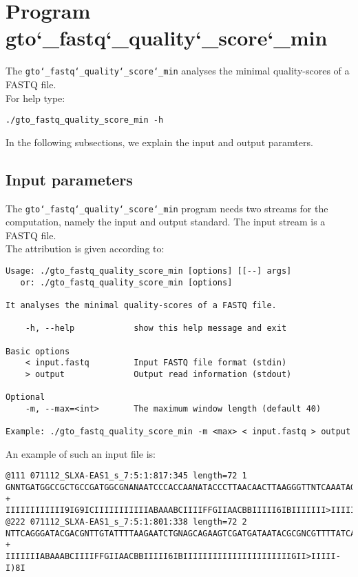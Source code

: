 \section{Program gto\char`_fastq\char`_quality\char`_score\char`_min}
The \texttt{gto\char`_fastq\char`_quality\char`_score\char`_min} analyses the minimal quality-scores of a FASTQ file.\\
For help type:
\begin{lstlisting}
./gto_fastq_quality_score_min -h
\end{lstlisting}
In the following subsections, we explain the input and output paramters.

\subsection*{Input parameters}

The \texttt{gto\char`_fastq\char`_quality\char`_score\char`_min} program needs two streams for the computation, namely the input and output standard. The input stream is a FASTQ file.\\
The attribution is given according to:
\begin{lstlisting}
Usage: ./gto_fastq_quality_score_min [options] [[--] args]
   or: ./gto_fastq_quality_score_min [options]

It analyses the minimal quality-scores of a FASTQ file.

    -h, --help            show this help message and exit

Basic options
    < input.fastq         Input FASTQ file format (stdin)
    > output              Output read information (stdout)

Optional
    -m, --max=<int>       The maximum window length (default 40)

Example: ./gto_fastq_quality_score_min -m <max> < input.fastq > output
\end{lstlisting}
An example of such an input file is:
\begin{lstlisting}
@111 071112_SLXA-EAS1_s_7:5:1:817:345 length=72 1
GNNTGATGGCCGCTGCCGATGGCGNANAATCCCACCAANATACCCTTAACAACTTAAGGGTTNTCAAATAGA
+
IIIIIIIIIIII9IG9ICIIIIIIIIIIIABAAABCIIIIFFGIIAACBBIIIII6IBIIIIIII>IIIIII/
@222 071112_SLXA-EAS1_s_7:5:1:801:338 length=72 2
NTTCAGGGATACGACGNTTGTATTTTAAGAATCTGNAGCAGAAGTCGATGATAATACGCGNCGTTTTATCAN
+
IIIIIIIABAAABCIIIIFFGIIAACBBIIIII6IBIIIIIIIIIIIIIIIIIIIIIIGII>IIIII-I)8I
\end{lstlisting}

